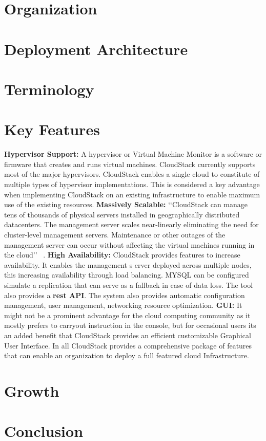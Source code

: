 \section{Organization}

\section{Deployment Architecture}

\section{Terminology}

\section{Key Features}
{\bf Hypervisor Support: } A hypervisor or Virtual Machine Monitor is a software or firmware that creates 
and runs virtual machines. CloudStack currently supports most of the major hypervisors.  CloudStack enables 
a single cloud to constitute of multiple types of hypervisor implementations. This is considered a key 
advantage when implementing CloudStack on an existing infrastructure to enable maximum use of the existing 
resources. {\bf Massively Scalable:} ‘‘CloudStack can manage tens of thousands of physical servers installed
in geographically distributed datacenters. The management server scales near-linearly eliminating the need for
cluster-level management servers. Maintenance or other outages of the management server can occur without
affecting the virtual machines running in the cloud’’ ~\cite{hid-sp18-417-www-cloudstack-scalability}. 
{\bf High Availability:} CloudStack provides features to increase availability. It enables the management s
erver deployed across multiple nodes, this increasing availability through load balancing. MYSQL can be configured
simulate a replication that can serve as a fallback in case of data loss. The tool also provides a {\bf rest API}.
The system also provides automatic configuration management, user management, networking resource optimization. 
{\bf GUI: } It might not be a prominent advantage for the cloud computing community as it mostly prefers to carryout 
instruction in the console, but for occasional users its an added benefit that CloudStack provides an efficient 
customizable Graphical User Interface. In all CloudStack provides a comprehensive package of features that can enable 
an organization to deploy a full featured cloud Infrastructure.

\section{Growth}

\section{Conclusion}


 
